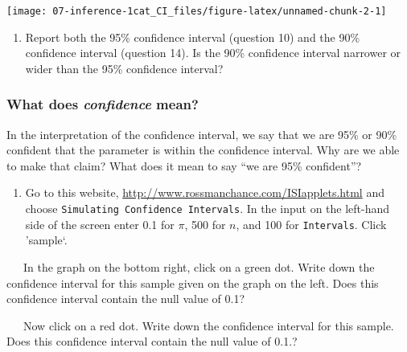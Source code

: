 \documentclass[
]{report}
\providecommand{\tightlist}{%
  \setlength{\itemsep}{0pt}\setlength{\parskip}{0pt}}
\begin{document}
\begin{center}\texttt{[image: 07-inference-1cat\_CI\_files/figure-latex/unnamed-chunk-2-1]} \end{center}

\vspace{0.5in}

\begin{enumerate}
\def\labelenumi{\arabic{enumi}.}
\setcounter{enumi}{14}
\tightlist
\item
  Report both the 95\% confidence interval (question 10) and the 90\% confidence interval (question 14). Is the 90\% confidence interval narrower or wider than the 95\% confidence interval?
\end{enumerate}

\vspace{0.5in}

\newpage

\hypertarget{what-does-confidence-mean}{%
\subsubsection{\texorpdfstring{What does \emph{confidence} mean?}{What does confidence mean?}}\label{what-does-confidence-mean}}

In the interpretation of the confidence interval, we say that we are 95\% or 90\% confident that the parameter is within the confidence interval. Why are we able to make that claim? What does it mean to say ``we are 95\% confident''?

\begin{enumerate}
\def\labelenumi{\arabic{enumi}.}
\setcounter{enumi}{15}
\tightlist
\item
  Go to this website, \url{http://www.rossmanchance.com/ISIapplets.html} and choose \texttt{Simulating\ Confidence\ Intervals}. In the input on the left-hand side of the screen enter 0.1 for \(\pi\), 500 for \(n\), and 100 for \texttt{Intervals}. Click 'sample`.
  \vspace{1mm}
\end{enumerate}

~~~In the graph on the bottom right, click on a green dot. Write down the confidence interval for this sample given on the graph on the left. Does this confidence interval contain the null value of 0.1?

\vspace{0.5in}

~~~Now click on a red dot. Write down the confidence interval for this sample. Does this confidence interval contain the null value of 0.1.?
\end{document}
